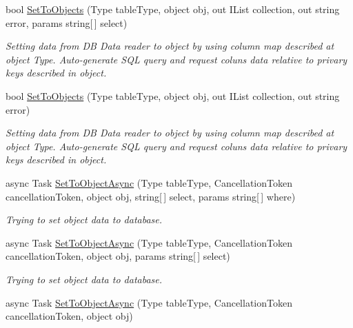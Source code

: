 \begin{DoxyCompactItemize}
bool \mbox{\hyperlink{class_uniform_data_operator_1_1_sql_1_1_my_sql_1_1_my_sql_data_operator_a26b72128803de85e9c44ac6deecc78c4}{Set\+To\+Objects}} (Type table\+Type, object obj, out I\+List collection, out string error, params string\mbox{[}$\,$\mbox{]} select)
\begin{DoxyCompactList}\small\item\em Setting data from DB Data reader to object by using column map described at object Type. Auto-\/generate S\+QL query and request coluns data relative to privary keys described in object. \end{DoxyCompactList}\item 
bool \mbox{\hyperlink{class_uniform_data_operator_1_1_sql_1_1_my_sql_1_1_my_sql_data_operator_a4079de461f0a37c0b69754a0e93dc05b}{Set\+To\+Objects}} (Type table\+Type, object obj, out I\+List collection, out string error)
\begin{DoxyCompactList}\small\item\em Setting data from DB Data reader to object by using column map described at object Type. Auto-\/generate S\+QL query and request coluns data relative to privary keys described in object. \end{DoxyCompactList}\item 
async Task \mbox{\hyperlink{class_uniform_data_operator_1_1_sql_1_1_my_sql_1_1_my_sql_data_operator_a98b579ed4a87c3f9dbdb90ffc28bf15c}{Set\+To\+Object\+Async}} (Type table\+Type, Cancellation\+Token cancellation\+Token, object obj, string\mbox{[}$\,$\mbox{]} select, params string\mbox{[}$\,$\mbox{]} where)
\begin{DoxyCompactList}\small\item\em Trying to set object data to database. \end{DoxyCompactList}\item 
async Task \mbox{\hyperlink{class_uniform_data_operator_1_1_sql_1_1_my_sql_1_1_my_sql_data_operator_a49ee22a2a69fbc0752c989c7b79e5e43}{Set\+To\+Object\+Async}} (Type table\+Type, Cancellation\+Token cancellation\+Token, object obj, params string\mbox{[}$\,$\mbox{]} select)
\begin{DoxyCompactList}\small\item\em Trying to set object data to database. \end{DoxyCompactList}\item 
async Task \mbox{\hyperlink{class_uniform_data_operator_1_1_sql_1_1_my_sql_1_1_my_sql_data_operator_a3be9aeb9ce11e3fd536449843a585490}{Set\+To\+Object\+Async}} (Type table\+Type, Cancellation\+Token cancellation\+Token, object obj)

\end{DoxyCompactItemize}
